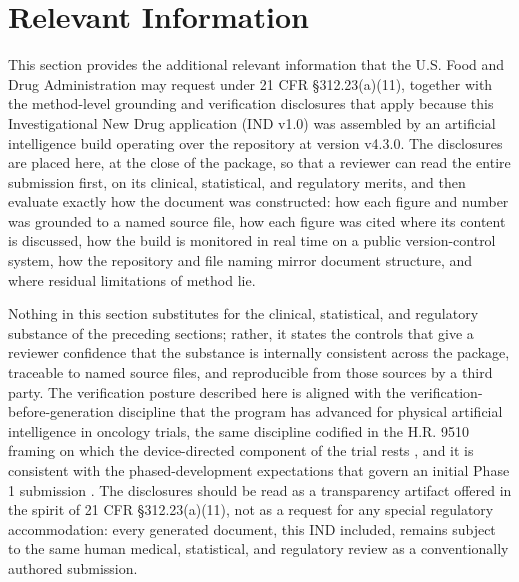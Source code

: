 \section{Relevant Information}

This section provides the additional relevant information that the U.S. Food and
Drug Administration may request under 21 CFR \S 312.23(a)(11), together with the
method-level grounding and verification disclosures that apply because this
Investigational New Drug application (IND v1.0) was assembled by an artificial
intelligence build operating over the repository at version v4.3.0. The
disclosures are placed here, at the close of the package, so that a reviewer can
read the entire submission first, on its clinical, statistical, and regulatory
merits, and then evaluate exactly how the document was constructed: how each
figure and number was grounded to a named source file, how each figure was cited
where its content is discussed, how the build is monitored in real time on a
public version-control system, how the repository and file naming mirror
document structure, and where residual limitations of method lie. 

Nothing
in this section substitutes for the clinical, statistical, and regulatory
substance of the preceding sections; rather, it states the controls that give a
reviewer confidence that the substance is internally consistent across the
package, traceable to named source files, and reproducible from those sources by a
third party. The verification posture described here is aligned with the
verification-before-generation discipline that the program has advanced for
physical artificial intelligence in oncology trials, the same discipline codified
in the H.R. 9510 framing on which the device-directed component of the trial rests
\cite{congress9510, clintrustpai}, and it is consistent with the
phased-development expectations that govern an initial Phase 1 submission
\cite{phase1guidance}. The disclosures should be read as a transparency artifact
offered in the spirit of 21 CFR \S 312.23(a)(11), not as a request for any special
regulatory accommodation: every generated document, this IND included, remains
subject to the same human medical, statistical, and regulatory review as a
conventionally authored submission.

